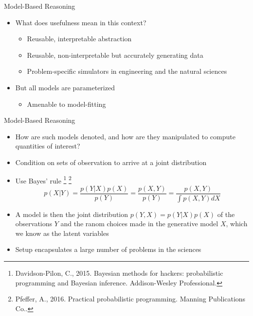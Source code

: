 \documentclass[AERbeamer%
              ,optEnglish%
              ,optBiber%
              ,optBibstyleAlphabetic%
              ,optBeamerClassicFormat%
              ]{AERlatex}%
\begin{document}
\begin{frame}[c]{Model-Based Reasoning}
    \centering
    \begin{itemize}
        \item What does usefulness mean in this context?
        \begin{itemize}
            \item Reusable, interpretable abstraction
            \item Reusable, non-interpretable but accurately generating data
            \item Problem-specific simulators in engineering and the natural sciences
        \end{itemize}
        \item But all models are parameterized
        \begin{itemize}
            \item Amenable to model-fitting
        \end{itemize}
    \end{itemize}
\end{frame}


\begin{frame}[c]{Model-Based Reasoning}
    \centering
    \begin{itemize}
        \item How are such models denoted, and how are they manipulated to compute quantities of interest?
        \item Condition on sets of observation to arrive at a joint distribution
        \item Use Bayes' rule \footnote{Davidson-Pilon, C., 2015. Bayesian methods for hackers: probabilistic
                                        programming and Bayesian inference. Addison-Wesley Professional.}
                              \footnote{Pfeffer, A., 2016. Practical probabilistic programming. Manning Publications Co..}
        \begin{equation*}
            p(X|Y) = \frac{p(Y|X) p(X)}{p(Y)} = \frac{p(X, Y)}{p(Y)} = \frac{p(X, Y)}{\int p(X, Y) dX}
        \end{equation*}
        \item A model is then the joint distribution $p(Y, X) = p(Y|X) p(X)$ of the observations $Y$ and the
              ranom choices made in the generative model $X$, which we know as the latent variables
        \item Setup encapsulates a large number of problems in the sciences
    \end{itemize}
\end{frame}
\end{document}
